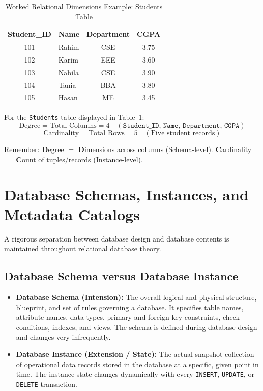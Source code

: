 \begin{table}[htbp]
\centering
\caption{Worked Relational Dimensions Example: Students Table}
\label{tab:degree_cardinality_example}
\begin{tabularx}{\textwidth}{c l c c}
\toprule
\textbf{Student\_ID} & \textbf{Name} & \textbf{Department} & \textbf{CGPA} \\
\midrule
101 & Rahim & CSE & 3.75 \\
102 & Karim & EEE & 3.60 \\
103 & Nabila & CSE & 3.90 \\
104 & Tania & BBA & 3.80 \\
105 & Hasan & ME & 3.45 \\
\bottomrule
\end{tabularx}
\end{table}

For the \texttt{Students} table displayed in Table~\ref{tab:degree_cardinality_example}:
\[ \text{Degree} = \text{Total Columns} = 4 \quad (\texttt{Student\_ID, Name, Department, CGPA}) \]
\[ \text{Cardinality} = \text{Total Rows} = 5 \quad (\text{Five student records}) \]

\begin{tcolorbox}[colback=yellow!10!white,colframe=yellow!60!black,title=\textbf{Exam Memory Mnemonic: Columns Degree, Rows Cardinality}]
Remember: \textbf{D}egree $=$ \textbf{D}imensions across columns (Schema-level). \textbf{C}ardinality $=$ \textbf{C}ount of tuples/records (Instance-level).
\end{tcolorbox}

\newpage
\section{Database Schemas, Instances, and Metadata Catalogs}

A rigorous separation between database design and database contents is maintained throughout relational database theory.

\subsection{Database Schema versus Database Instance}

\begin{itemize}
\item \textbf{Database Schema (Intension):} The overall logical and physical structure, blueprint, and set of rules governing a database. It specifies table names, attribute names, data types, primary and foreign key constraints, check conditions, indexes, and views. The schema is defined during database design and changes very infrequently.
\item \textbf{Database Instance (Extension / State):} The actual snapshot collection of operational data records stored in the database at a specific, given point in time. The instance state changes dynamically with every \texttt{INSERT}, \texttt{UPDATE}, or \texttt{DELETE} transaction.
\end{itemize}

